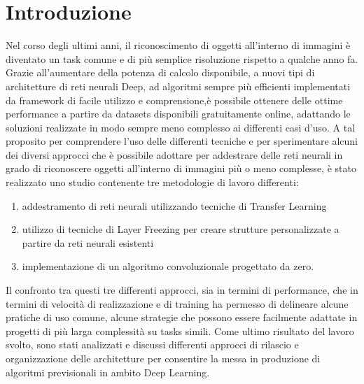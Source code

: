 \section{Introduzione}
Nel corso degli ultimi anni, il riconoscimento di oggetti all'interno di immagini è diventato un task comune e di più semplice risoluzione rispetto a qualche anno fa.  
Grazie all'aumentare della potenza di calcolo disponibile, a nuovi tipi di architetture di reti neurali Deep, ad algoritmi sempre più efficienti implementati da framework di facile utilizzo e comprensione,è possibile ottenere delle ottime performance a partire da datasets disponibili gratuitamente online, adattando le soluzioni realizzate in modo sempre meno complesso ai differenti casi d'uso.  
A tal proposito per comprendere l'uso delle differenti tecniche e per sperimentare alcuni dei diversi approcci che è possibile adottare per addestrare delle reti neurali in grado di riconoscere oggetti all'interno di immagini più o meno complesse, è stato realizzato uno studio contenente tre metodologie di lavoro differenti:
\begin{enumerate}
\item addestramento di reti neurali utilizzando tecniche di Transfer Learning \cite{transferlearning}
\item utilizzo di tecniche di Layer Freezing per creare strutture personalizzate a partire da reti neurali esistenti
\item implementazione di un algoritmo convoluzionale progettato da zero.
\end{enumerate}

Il confronto tra questi tre differenti approcci, sia in termini di performance, che in termini di velocità di realizzazione e di training ha permesso di delineare alcune pratiche di uso comune, alcune strategie che possono essere facilmente adattate in progetti di più larga complessità su tasks simili.  
Come ultimo risultato del lavoro svolto, sono stati analizzati e discussi differenti approcci di rilascio e organizzazione delle architetture per consentire la messa in produzione di algoritmi previsionali in ambito Deep Learning.



